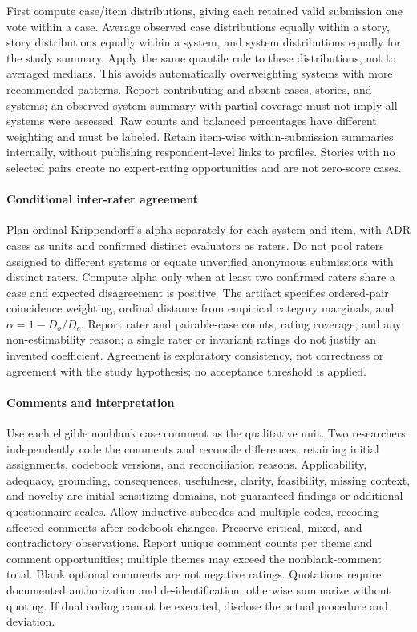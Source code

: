 First compute case/item distributions, giving each retained valid submission
one vote within a case. Average observed case distributions equally within
a story, story distributions equally within a system, and system
distributions equally for the study summary. Apply the same quantile rule
to these distributions, not to averaged medians. This avoids automatically
overweighting systems with more recommended patterns. Report contributing
and absent cases, stories, and systems; an observed-system summary with
partial coverage must not imply all \StudySystemCount{} systems were assessed. Raw counts
and balanced percentages have different weighting and must be labeled.
Retain item-wise within-submission summaries internally, without publishing
respondent-level links to profiles. Stories with no selected pairs create
no expert-rating opportunities and are not zero-score cases.

\paragraph{Conditional inter-rater agreement}
Plan ordinal Krippendorff's alpha separately for each system and item, with
ADR cases as units and confirmed distinct evaluators as raters. Do not pool
raters assigned to different systems or equate unverified anonymous
submissions with distinct raters. Compute alpha only when at least two
confirmed raters share a case and expected disagreement is positive.
The artifact specifies ordered-pair coincidence weighting, ordinal distance
from empirical category marginals, and $\alpha=1-D_o/D_e$.
Report rater and pairable-case counts, rating coverage, and any
non-estimability reason; a single rater or invariant ratings do not justify
an invented coefficient. Agreement is exploratory consistency, not correctness
or agreement with the study hypothesis; no acceptance threshold is applied.

\paragraph{Comments and interpretation}
Use each eligible nonblank case comment as the qualitative unit. Two
researchers independently code the comments and reconcile differences,
retaining initial assignments, codebook versions, and reconciliation reasons.
Applicability, adequacy, grounding, consequences, usefulness, clarity,
feasibility, missing context, and novelty are initial sensitizing domains,
not guaranteed findings or additional questionnaire scales. Allow inductive
subcodes and multiple codes, recoding affected comments after codebook changes.
Preserve critical, mixed, and contradictory observations. Report unique
comment counts per theme and comment opportunities; multiple themes may
exceed the nonblank-comment total. Blank optional comments are not negative
ratings. Quotations require documented authorization and de-identification;
otherwise summarize without quoting. If dual coding cannot be executed,
disclose the actual procedure and deviation.

